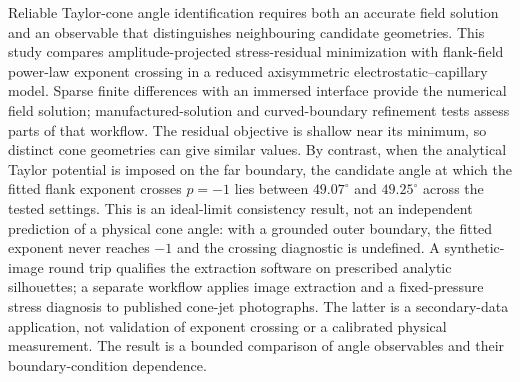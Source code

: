 Reliable Taylor-cone angle identification requires both an accurate field solution and an observable that distinguishes neighbouring candidate geometries. This study compares amplitude-projected stress-residual minimization with flank-field power-law exponent crossing in a reduced axisymmetric electrostatic--capillary model. Sparse finite differences with an immersed interface provide the numerical field solution; manufactured-solution and curved-boundary refinement tests assess parts of that workflow. The residual objective is shallow near its minimum, so distinct cone geometries can give similar values. By contrast, when the analytical Taylor potential is imposed on the far boundary, the candidate angle at which the fitted flank exponent crosses $p=-1$ lies between $49.07^\circ$ and $49.25^\circ$ across the tested settings. This is an ideal-limit consistency result, not an independent prediction of a physical cone angle: with a grounded outer boundary, the fitted exponent never reaches $-1$ and the crossing diagnostic is undefined. A synthetic-image round trip qualifies the extraction software on prescribed analytic silhouettes; a separate workflow applies image extraction and a fixed-pressure stress diagnosis to published cone-jet photographs. The latter is a secondary-data application, not validation of exponent crossing or a calibrated physical measurement. The result is a bounded comparison of angle observables and their boundary-condition dependence.